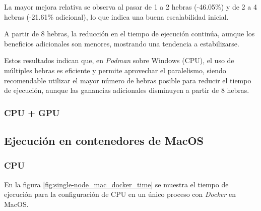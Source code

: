 La mayor mejora relativa se observa al pasar de 1 a 2 hebras (-46.05\%) y de 2 a 4 hebras (-21.61\% adicional), lo que indica una buena escalabilidad inicial.

A partir de 8 hebras, la reducción en el tiempo de ejecución continúa, aunque los beneficios adicionales son menores, mostrando una tendencia a estabilizarse.

Estos resultados indican que, en \textit{Podman} sobre Windows (CPU), el uso de múltiples hebras es eficiente y permite aprovechar el paralelismo, siendo recomendable utilizar el mayor número de hebras posible para reducir el tiempo de ejecución, aunque las ganancias adicionales disminuyen a partir de 8 hebras.

\subsubsection{CPU + GPU}




\subsection{Ejecución en contenedores de MacOS}
\subsubsection{CPU}

En la figura \ref{fig:single-node_mac_docker_time} se muestra el tiempo de ejecución para la configuración de CPU en un único proceso con \textit{Docker} en MacOS.

